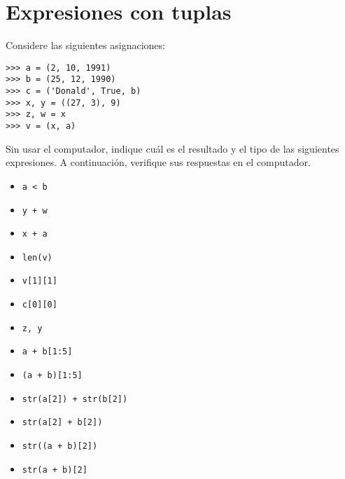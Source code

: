 \section{Expresiones con tuplas}

Considere las siguientes asignaciones:

\begin{lstlisting}
>>> a = (2, 10, 1991)
>>> b = (25, 12, 1990)
>>> c = ('Donald', True, b)
>>> x, y = ((27, 3), 9)
>>> z, w = x
>>> v = (x, a)
\end{lstlisting}

Sin usar el computador, indique cuál es el resultado y el tipo de las
siguientes expresiones. A continuación, verifique sus respuestas en el
computador.

\begin{itemize}
\item
  \lstinline!a < b!
\item
  \lstinline!y + w!
\item
  \lstinline!x + a!
\item
  \lstinline!len(v)!
\item
  \lstinline!v[1][1]!
\item
  \lstinline!c[0][0]!
\item
  \lstinline!z, y!
\item
  \lstinline!a + b[1:5]!
\item
  \lstinline!(a + b)[1:5]!
\item
  \lstinline!str(a[2]) + str(b[2])!
\item
  \lstinline!str(a[2] + b[2])!
\item
  \lstinline!str((a + b)[2])!
\item
  \lstinline!str(a + b)[2]!
\end{itemize}
